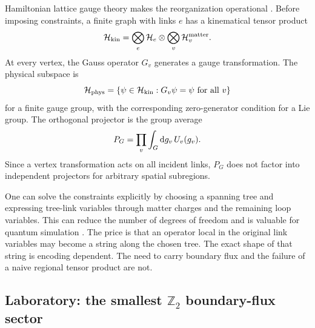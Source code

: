 Hamiltonian lattice gauge theory makes the reorganization operational
\cite{KogutSusskind:1975}.  Before imposing constraints, a finite graph with
links $e$ has a kinematical tensor product
\begin{equation}
  \mathcal{H}_{\mathrm{kin}}
  =\bigotimes_e\mathcal{H}_e
  \otimes\bigotimes_v\mathcal{H}_v^{\mathrm{matter}}.
  \label{eq:lattice-kinematical-tensor-product}
\end{equation}
At every vertex, the Gauss operator $G_v$ generates a gauge transformation.
The physical subspace is
\begin{equation}
  \mathcal{H}_{\mathrm{phys}}
  =\{\psi\in\mathcal{H}_{\mathrm{kin}}:
    \text{$G_v\psi=\psi$ for all $v$}\}
  \label{eq:lattice-gauss-subspace}
\end{equation}
for a finite gauge group, with the corresponding zero-generator condition
for a Lie group.  The orthogonal projector is the group average
\begin{equation}
  P_G=\prod_v\int_G\mathrm{d} g_v\,U_v(g_v).
  \label{eq:lattice-gauss-projector}
\end{equation}
Since a vertex transformation acts on all incident links,
$P_G$ does not factor into independent projectors for arbitrary spatial
subregions.

One can solve the constraints explicitly by choosing a spanning tree and
expressing tree-link variables through matter charges and the remaining loop
variables.  This can reduce the number of degrees of freedom and is valuable
for quantum simulation \cite{PardoEtAl:2023}.  The price is that an operator
local in the original link variables may become a string along the chosen
tree.  The exact shape of that string is encoding dependent.  The need to
carry boundary flux and the failure of a naive regional tensor product are
not.

\subsection{Laboratory: the smallest \texorpdfstring{$\mathbb Z_2$}{Z2}
boundary-flux sector}

